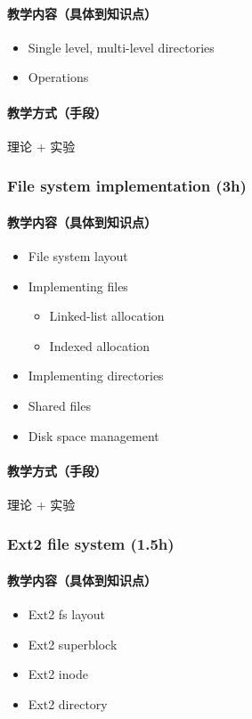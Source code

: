 \documentclass[11pt]{article}
\begin{document}
\paragraph{教学内容（具体到知识点）}
\label{sec-7-2-2-1}
\begin{itemize}
\item Single level, multi-level directories
\item Operations
\end{itemize}
\paragraph{教学方式（手段）}
\label{sec-7-2-2-2}
理论 + 实验
\subsubsection{File system implementation (3h)}
\label{sec-7-2-3}
\paragraph{教学内容（具体到知识点）}
\label{sec-7-2-3-1}
\begin{itemize}
\item File system layout
\item Implementing files
\begin{itemize}
\item Linked-list allocation
\item Indexed allocation
\end{itemize}
\item Implementing directories
\item Shared files
\item Disk space management
\end{itemize}
\paragraph{教学方式（手段）}
\label{sec-7-2-3-2}
理论 + 实验
\subsubsection{Ext2 file system (1.5h)}
\label{sec-7-2-4}
\paragraph{教学内容（具体到知识点）}
\label{sec-7-2-4-1}
\begin{itemize}
\item Ext2 fs layout
\item Ext2 superblock
\item Ext2 inode
\item Ext2 directory
\end{itemize}
\end{document}
